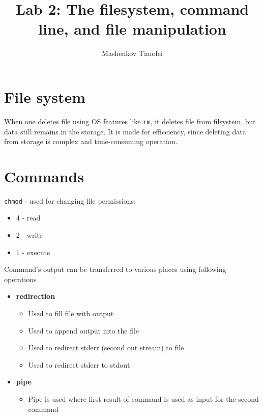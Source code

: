 \documentclass{article}
\title{Lab 2: The filesystem, command line, and file manipulation}
\author{Mashenkov Timofei}
\begin{document}
\maketitle{}

\section*{File system}

When one deletes file using OS features like \texttt{rm}, it deletes file from filsystem, but data still remains in the
storage.
It is made for efficciency, since deleting data from storage is complex and time-consuming operation.

\section*{Commands}

\texttt{chmod} - used for changing file permissions:

\begin{itemize}
	\item 4 - read
	\item 2 - write
	\item 1 - execute
\end{itemize}

Command's output can be transferred to various places using following operations

\begin{itemize}
	\item \textbf{redirection}
	      \begin{itemize}
		      \item {}

		            Used to fill file with output
		      \item {}

		            Used to append output into the file
		      \item {}

		            Used to redirect stderr (second out stream) to file

		      \item {}

		            Used to redirect stderr to stdout

	      \end{itemize}
  \item \textbf{pipe}
        \begin{itemize}
          \item {}

            Pipe is used where first result of command is used as input for the second command
        \end{itemize}
\end{itemize}
\end{document}
